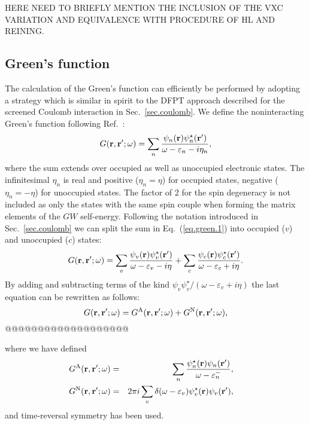 \documentclass[twocolumn,prb,showpacs,superscriptaddress]{revtex4}
\def\w{\omega}
\def\E{\varepsilon}
\def\r{{\bf r}}
\def\rp{{\bf r^\prime}}
\begin{document}
HERE NEED TO BRIEFLY MENTION THE INCLUSION OF THE VXC VARIATION
AND EQUIVALENCE WITH PROCEDURE OF HL AND REINING.

\subsection{Green's function}\label{sec.green}

The calculation of the Green's function can efficiently be performed 
by adopting a strategy which is similar in spirit to the DFPT approach
described for the screened Coulomb interaction in Sec.\ \ref{sec.coulomb}.
We define the noninteracting Green's function following Ref.\ :
  \begin{equation}\label{eq.green.1}
  G(\r,\rp;\w) = \sum_n \frac{\psi_n(\r)\psi_n^\star(\rp)}{\w-\E_n-i\eta_n},
  \end{equation}
where the sum extends over occupied as well as unoccupied electronic states.
The infinitesimal $\eta_n$ is real and positive ($\eta_n=\eta$) 
for occupied states, negative ($\eta_n=-\eta$) for unoccupied states.\cite{hl,hl86}
The factor of 2 for the spin degeneracy is not included
as only the states with the same spin couple when forming the 
matrix elements of the $GW$ self-energy.\cite{hl86}
Following the notation introduced in Sec.\ \ref{sec.coulomb} we can split the
sum in Eq.~(\ref{eq.green.1}) into occupied ($v$) and unoccupied ($c$) states:
  \begin{equation}\label{eq.green.2}
  G(\r,\rp;\w) = \sum_v \frac{\psi_v(\r)\psi_v^\star(\rp)}{\w-\E_v-i\eta}
  + \sum_c \frac{\psi_c(\r)\psi_c^\star(\rp)}{\w-\E_c+i\eta}.
  \end{equation}
By adding and subtracting terms of the kind $\psi_v\psi_v^\star/(\w-\E_v+i\eta)$
the last equation can be rewritten as follows:
  \begin{equation}\label{eq.green.split}
  G(\r,\rp;\w) = G^{\rm A}(\r,\rp;\w) + G^{\rm N}(\r,\rp;\w),
  \end{equation}
@@@@@@@@@@@@@@@@@@@

where we have defined
  \begin{eqnarray}\label{eq.green.split.2}
\!\!\!\!\!\!  G^{\rm A}(\r,\rp;\w) & =&  \sum_n \frac{\psi_n^\star(\r)\psi_n(\rp)}{\w-\E_n^-},  \\ 
\!\!\!\!\!\!  G^{\rm N}(\r,\rp;\w)  & = &  2\pi i \sum_v \delta(\w-\E_v) \psi_v^\star(\r)\psi_v(\rp), \label{eq.green.split.3} 
  \end{eqnarray}
and time-reversal symmetry has been used.
\end{document}
